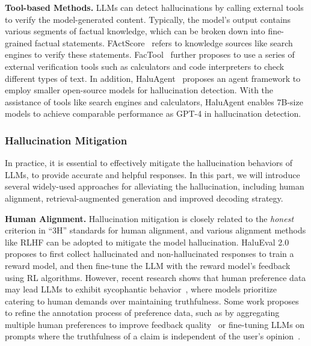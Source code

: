 \textbf{Tool-based Methods.} LLMs can detect hallucinations by calling external tools to verify the model-generated content. Typically, the model's output contains various segments of factual knowledge, which can be broken down into fine-grained factual statements. FActScore~\cite{Min-arxiv-2023-FActScore} refers to knowledge sources like search engines to verify these statements. FacTool~\cite{Chern-arxiv-2023-FacTool} further proposes to use a series of external verification tools such as calculators and code interpreters to check different types of text. In addition, HaluAgent~\cite{Chen-arxiv-2024-haluagent} proposes an agent framework to employ smaller open-source models for hallucination detection. With the assistance of tools like search engines and calculators, HaluAgent enables 7B-size models to achieve comparable performance as GPT-4 in hallucination detection. 

\subsubsection{Hallucination Mitigation} In practice, it is essential to effectively mitigate the hallucination behaviors of LLMs, to provide accurate and helpful responses. In this part, we will introduce several widely-used approaches for alleviating the hallucination, including human alignment, retrieval-augmented generation and improved decoding strategy. 

\textbf{Human Alignment.} Hallucination mitigation is closely related to the \emph{honest} criterion in  ``3H'' standards for human alignment, and various alignment methods like RLHF can be adopted to mitigate the model hallucination. HaluEval 2.0~\cite{Li-arxiv-2024-dawn} proposes to first collect hallucinated and non-hallucinated responses to train a reward model, and then fine-tune the LLM with the reward model’s feedback using RL algorithms. However, recent research shows that human preference data may lead LLMs to exhibit sycophantic behavior~\cite{Sharma-iclr-2024-Sycophancy}, where models prioritize catering to human demands over maintaining truthfulness. Some work proposes to refine the annotation process of preference data, such as by aggregating multiple human preferences to improve feedback quality~\cite{Sharma-iclr-2024-Sycophancy} or fine-tuning LLMs on prompts where the truthfulness of a claim is independent of the user’s opinion~\cite{Wei-arxiv-2023-sycophancy}.

